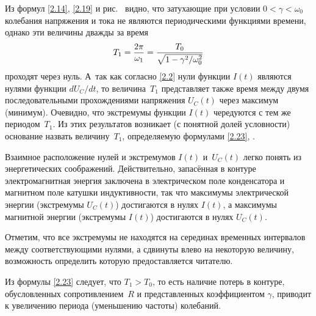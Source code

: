 Из формул \eqref{2.14}, \eqref{2.19} и рис.~ видно, что затухающие
при условии $0<\gamma<\omega_0$ колебания напряжения и тока не являются
периодическими функциями времени, однако эти величины дважды за время
\begin{equation}\eqmark{2.23}
T_1=\dfrac{2\pi}{\omega_1}=\dfrac{T_0}{\sqrt{1-\gamma^2/\omega_0^2}}
\end{equation}
проходят через нуль. А~так как согласно \eqref{2.2} нули функции $I(t)$ являются
нулями функции $dU_C/dt$, то величина~$T_1$ представляет также время между двумя
последовательными прохождениями напряжения $U_C(t)$ через максимум (минимум).
Очевидно, что экстремумы функции $I(t)$ чередуются с тем же периодом~$T_1$. Из
этих результатов возникает (с понятной долей условности) основание назвать
величину~$T_1$, определяемую формулами \eqref{2.23}, .

Взаимное расположение нулей и экстремумов $I(t)$ и~$U_C(t)$ легко понять из
энергетических соображений. Действительно, запасённая в контуре электромагнитная
энергия заключена в электрическом поле конденсатора и магнитном поле катушки
индуктивности, так что максимумы электрической энергии (экстремумы $U_C(t)$)
достигаются в нулях $I(t)$, а максимумы магнитной энергии (экстремумы $I(t)$)
достигаются в нулях $U_C(t)$.

Отметим, что все экстремумы не находятся на серединах временных интервалов между
соответствующими нулями, а сдвинуты влево на некоторую величину, возможность
определить которую предоставляется читателю.

Из формулы \eqref{2.23} следует, что $T_1>T_0$, то есть наличие потерь в
контуре, обусловленных сопротивлением~$R$ и представленных коэффициентом
$\gamma$, приводит к увеличению периода (уменьшению частоты) колебаний.

